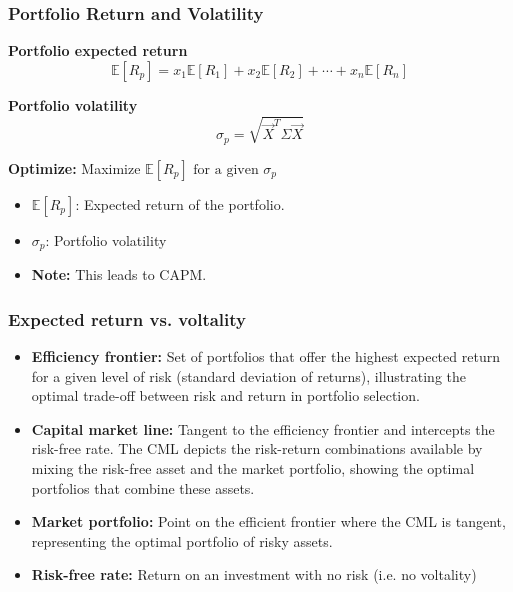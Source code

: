     \subsubsection{Portfolio Return and Volatility}
    \begin{intuition}
        \textbf{Portfolio expected return}
        \[
        \mathbb{E} \left[ R_p \right] = x_1 \mathbb{E} \left[ R_1 \right] + x_2 \mathbb{E} \left[ R_2 \right] + \cdots + x_n \mathbb{E} \left[ R_n \right]
        \]
        \vspace{1em}

        \textbf{Portfolio volatility}
        \[
        \sigma_p = \sqrt{\vec{X}^T \Sigma \vec{X}}
        \]
        \vspace{1em}

        \textbf{Optimize:} Maximize \(\mathbb{E} \left[ R_p \right] \text{ for a given } \sigma_p \)
        \begin{itemize}
            \item $\mathbb{E} \left[ R_p \right]$: Expected return of the portfolio. 
            \item $\sigma_p$: Portfolio volatility
            \item \textbf{Note:} This leads to CAPM.
        \end{itemize}
    \end{intuition}

    \subsubsection{Expected return vs. voltality}
    \begin{intuition}
        \begin{itemize}
            \item \textbf{Efficiency frontier:} Set of portfolios that offer the highest expected return for a given level of risk (standard deviation of returns), illustrating the optimal trade-off between risk and return in portfolio selection.
            \item \textbf{Capital market line:} Tangent to the efficiency frontier and intercepts the risk-free rate.  The CML depicts the risk-return combinations available by mixing the risk-free asset and the market portfolio, showing the optimal portfolios that combine these assets.
            \item \textbf{Market portfolio:} Point on the efficient frontier where the CML is tangent, representing the optimal portfolio of risky assets.
            \item \textbf{Risk-free rate:} Return on an investment with no risk (i.e. no voltality)
        \end{itemize}
    \end{intuition}

